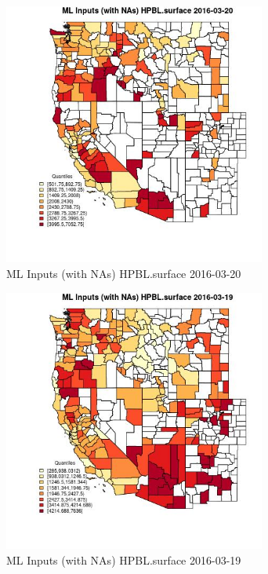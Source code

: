 \begin{figure} 
\centering  
\includegraphics[width=0.77\textwidth]{Code_Outputs/Report_ML_input_PM25_Step4_part_e_de_duplicated_aveswNAs_CountyHPBLsurfaceMean2016-03-20_2016-03-20.jpg} 
\caption{\label{fig:Report_ML_input_PM25_Step4_part_e_de_duplicated_aveswNAsCountyHPBLsurfaceMean2016-03-20_2016-03-20}ML Inputs (with NAs) HPBL.surface 2016-03-20} 
\end{figure} 
 

\begin{figure} 
\centering  
\includegraphics[width=0.77\textwidth]{Code_Outputs/Report_ML_input_PM25_Step4_part_e_de_duplicated_aveswNAs_CountyHPBLsurfaceMean2016-03-19_2016-03-19.jpg} 
\caption{\label{fig:Report_ML_input_PM25_Step4_part_e_de_duplicated_aveswNAsCountyHPBLsurfaceMean2016-03-19_2016-03-19}ML Inputs (with NAs) HPBL.surface 2016-03-19} 
\end{figure} 
 

